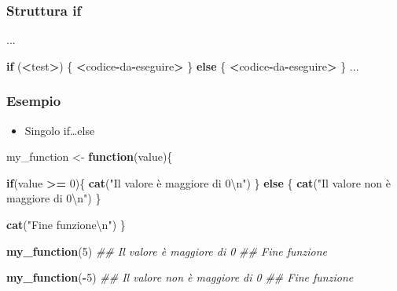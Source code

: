 \documentclass[
]{book}
\newenvironment{Shaded}{\begin{snugshade}}{\end{snugshade}}
\newcommand{\CharTok}[1]{\textcolor[rgb]{0.31,0.60,0.02}{#1}}
\newcommand{\CommentTok}[1]{\textcolor[rgb]{0.56,0.35,0.01}{\textit{#1}}}
\newcommand{\ControlFlowTok}[1]{\textcolor[rgb]{0.13,0.29,0.53}{\textbf{#1}}}
\newcommand{\DecValTok}[1]{\textcolor[rgb]{0.00,0.00,0.81}{#1}}
\newcommand{\KeywordTok}[1]{\textcolor[rgb]{0.13,0.29,0.53}{\textbf{#1}}}
\newcommand{\NormalTok}[1]{#1}
\newcommand{\OperatorTok}[1]{\textcolor[rgb]{0.81,0.36,0.00}{\textbf{#1}}}
\newcommand{\StringTok}[1]{\textcolor[rgb]{0.31,0.60,0.02}{#1}}
\providecommand{\tightlist}{%
  \setlength{\itemsep}{0pt}\setlength{\parskip}{0pt}}
\begin{document}
\hypertarget{struttura-if-1}{%
\subsubsection*{Struttura if}\label{struttura-if-1}}

\begin{Shaded}
\begin{Highlighting}[]
\NormalTok{  ...}
  
  \ControlFlowTok{if}\NormalTok{ (}\OperatorTok{<}\NormalTok{test}\OperatorTok{>}\NormalTok{) \{}
    \OperatorTok{<}\NormalTok{codice}\OperatorTok{-}\NormalTok{da}\OperatorTok{-}\NormalTok{eseguire}\OperatorTok{>}
\StringTok{  }\NormalTok{\} }\ControlFlowTok{else}\NormalTok{ \{}
    \OperatorTok{<}\NormalTok{codice}\OperatorTok{-}\NormalTok{da}\OperatorTok{-}\NormalTok{eseguire}\OperatorTok{>}
\StringTok{  }\NormalTok{\}}
\NormalTok{  ...}
\end{Highlighting}
\end{Shaded}

\hypertarget{esempio-1}{%
\subsubsection*{Esempio}\label{esempio-1}}

\begin{itemize}
\tightlist
\item
  Singolo if\ldots else
\end{itemize}

\begin{Shaded}
\begin{Highlighting}[]
\NormalTok{my_function <-}\StringTok{ }\ControlFlowTok{function}\NormalTok{(value)\{}
  
  \ControlFlowTok{if}\NormalTok{(value }\OperatorTok{>=}\StringTok{ }\DecValTok{0}\NormalTok{)\{}
    \KeywordTok{cat}\NormalTok{(}\StringTok{"Il valore è maggiore di 0}\CharTok{\textbackslash{}n}\StringTok{"}\NormalTok{)}
\NormalTok{  \} }\ControlFlowTok{else}\NormalTok{ \{}
    \KeywordTok{cat}\NormalTok{(}\StringTok{"Il valore non è maggiore di 0}\CharTok{\textbackslash{}n}\StringTok{"}\NormalTok{)}
\NormalTok{  \}}
  
  \KeywordTok{cat}\NormalTok{(}\StringTok{"Fine funzione}\CharTok{\textbackslash{}n}\StringTok{"}\NormalTok{)}
\NormalTok{\}}

\KeywordTok{my_function}\NormalTok{(}\DecValTok{5}\NormalTok{)}
\CommentTok{## Il valore è maggiore di 0}
\CommentTok{## Fine funzione}

\KeywordTok{my_function}\NormalTok{(}\OperatorTok{-}\DecValTok{5}\NormalTok{)}
\CommentTok{## Il valore non è maggiore di 0}
\CommentTok{## Fine funzione}
\end{Highlighting}
\end{Shaded}
\end{document}
